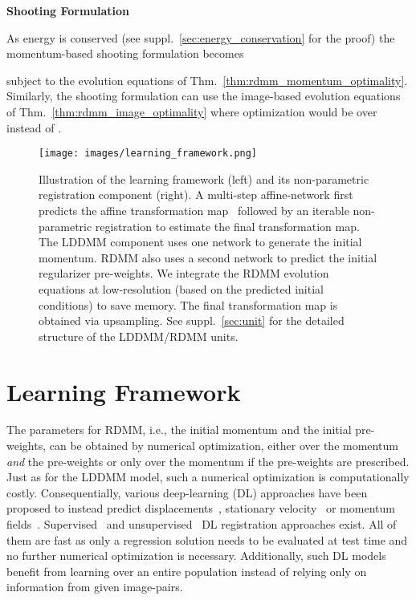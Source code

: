 \documentclass{article}
\numberwithin{equation}{section}
\newcommand{\ie}{{i.e.}}
\begin{document}
{\bf Shooting Formulation}

As energy is conserved (see suppl.~\ref{sec:energy_conservation} for the proof) the momentum-based shooting formulation becomes

subject to the evolution equations of Thm.~\ref{thm:rdmm_momentum_optimality}. Similarly, the shooting formulation can use the image-based evolution equations of Thm.~\ref{thm:rdmm_image_optimality} where optimization would be over  instead of .







\begin{figure}[!t]
\texttt{[image: images/learning\_framework.png]}
\caption{Illustration of the learning framework (left) and its non-parametric registration component (right). A multi-step affine-network first predicts the affine transformation map~\cite{shen2019networks} followed by an iterable non-parametric registration to estimate the final transformation map. The LDDMM component uses one network to generate the initial momentum. RDMM also uses a second network to predict the initial regularizer pre-weights. We integrate the RDMM evolution equations at low-resolution (based on the predicted initial conditions) to save memory. The final transformation map is obtained via upsampling. See suppl.~\ref{sec:unit} for the detailed structure of the LDDMM/RDMM units.} 
\label{fig:framework_rdmm}
\end{figure}


\section{Learning Framework}
\label{sec:learning_framework}

The parameters for RDMM, \ie, the initial momentum and the initial pre-weights, can be obtained by numerical optimization, either over the momentum \emph{and} the pre-weights or only over the momentum if the pre-weights are prescribed. Just as for the LDDMM model, such a numerical optimization is computationally costly. Consequentially, various deep-learning (DL) approaches have been proposed to instead predict displacements~\citep{balakrishnan2018unsupervised,cao2018deformable}, stationary velocity~\citep{rohe2017svf} or momentum fields~\citep{yang2017quicksilver,niethammer2019_cvpr}.  Supervised~\cite{yang2017quicksilver,yang2016fast} and unsupervised~\cite{jaderberg2015spatial,de2017end,li2017non,balakrishnan2018unsupervised,dalca2018unsupervised} DL registration approaches exist. All of them are fast as only a regression solution needs to be evaluated at test time and no further numerical optimization is necessary. Additionally, such DL models benefit from learning over an entire population instead of relying only on information from given image-pairs. 
\end{document}

